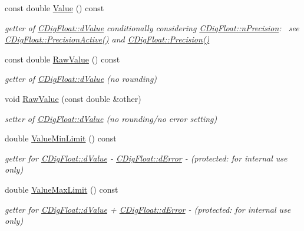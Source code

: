 \begin{DoxyCompactItemize}
const double \hyperlink{classCDigFloat_a308ccc3e3c96dd81977033e0a94344fd}{Value} () const
\begin{DoxyCompactList}\small\item\em getter of \hyperlink{classCDigFloat_a4bbe69e30dd4e20527362493aa9aaf96}{C\+Dig\+Float\+::d\+Value} conditionally considering \hyperlink{classCDigFloat_ad580654be35246d14c91482581c0bc11}{C\+Dig\+Float\+::n\+Precision}\+:~\newline
 see \hyperlink{classCDigFloat_a4d6ca24beda280be719374c2a6b2c64d}{C\+Dig\+Float\+::\+Precision\+Active()} and \hyperlink{classCDigFloat_a95875f6f7246debee0d00b0c41c82aee}{C\+Dig\+Float\+::\+Precision()} \end{DoxyCompactList}\item 
const double \hyperlink{classCDigFloat_ab6d3001a549d7496156321cbb26dde51}{Raw\+Value} () const
\begin{DoxyCompactList}\small\item\em getter of \hyperlink{classCDigFloat_a4bbe69e30dd4e20527362493aa9aaf96}{C\+Dig\+Float\+::d\+Value} (no rounding) \end{DoxyCompactList}\item 
void \hyperlink{classCDigFloat_a10dd39f19bfc21ae1d545d9203ef3e95}{Raw\+Value} (const double \&other)
\begin{DoxyCompactList}\small\item\em setter of \hyperlink{classCDigFloat_a4bbe69e30dd4e20527362493aa9aaf96}{C\+Dig\+Float\+::d\+Value} (no rounding/no error setting) \end{DoxyCompactList}\item 
double \hyperlink{classCDigFloat_a89603e1f9b9061b65376ac7b5fffddcf}{Value\+Min\+Limit} () const
\begin{DoxyCompactList}\small\item\em getter for \hyperlink{classCDigFloat_a4bbe69e30dd4e20527362493aa9aaf96}{C\+Dig\+Float\+::d\+Value} -\/ \hyperlink{classCDigFloat_a25eb3782d1e727ff007a48f8308e3d4d}{C\+Dig\+Float\+::d\+Error} -\/ (protected\+: for internal use only) \end{DoxyCompactList}\item 
double \hyperlink{classCDigFloat_a20195234feac0aaa9acbb5ad0fcfeabb}{Value\+Max\+Limit} () const
\begin{DoxyCompactList}\small\item\em getter for \hyperlink{classCDigFloat_a4bbe69e30dd4e20527362493aa9aaf96}{C\+Dig\+Float\+::d\+Value} + \hyperlink{classCDigFloat_a25eb3782d1e727ff007a48f8308e3d4d}{C\+Dig\+Float\+::d\+Error} -\/ (protected\+: for internal use only) \end{DoxyCompactList}\item 

\end{DoxyCompactItemize}
